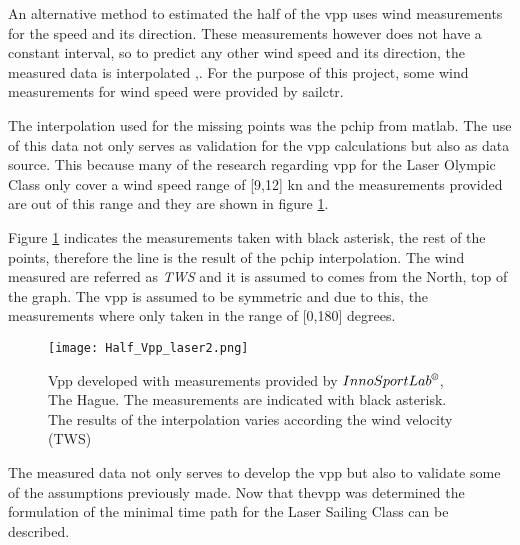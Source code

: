 An alternative method to estimated the half of the  \acrshort{vpp} uses wind measurements for the speed and its direction. These measurements however does not have a constant interval, so to predict any other wind speed and its direction, the measured data is interpolated  
\cite{philpott2001optimising},\cite{allsopp2000optimal}. For the purpose of this project, some wind measurements for wind speed  were provided by \acrlong{sailctr}. \par \noindent 
The interpolation used for the missing points was the \acrfull{pchip} from \acrshort{matlab}. The use of this data not only serves as validation for the \acrshort{vpp} calculations but also as data source. This because many of the research regarding \acrshort{vpp} for the Laser Olympic Class only cover a wind speed range of [9,12] kn \cite{day2017performance} and the measurements provided are out of this range and they are shown in figure \ref{fig:hvpp_MeasData}.\par \noindent
Figure \ref{fig:hvpp_MeasData} indicates the measurements taken with black asterisk, the rest of the points, therefore the line is the result of the \acrshort{pchip} interpolation. The wind measured are referred as \textit{TWS} and it is assumed to comes from the North, top of the graph. The \acrshort{vpp} is assumed to be symmetric and due to this, the measurements where only taken in the range of [0,180] degrees. \par 
\begin{figure} [hbt!]
    \centering
    \texttt{[image: Half\_Vpp\_laser2.png]}
    \caption{Vpp developed with measurements provided by $InnoSportLab\textsuperscript {\textregistered}$, The Hague. The measurements are indicated with black asterisk. The results of the interpolation varies according the wind velocity (TWS)}
    \label{fig:hvpp_MeasData}
\end{figure}
The measured data not only serves to develop the \acrshort{vpp} but also to validate some of the assumptions previously made. Now that the\acrshort{vpp} was determined the formulation of the minimal time path for the Laser Sailing Class can be described.  \par 

